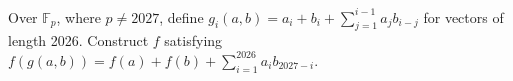 Over $\mathbb F_p$, where $p\ne2027$, define $g_i(a,b)=a_i+b_i+\sum_{j=1}^{i-1}a_jb_{i-j}$ for vectors of length 2026. Construct $f$ satisfying $f(g(a,b))=f(a)+f(b)+\sum_{i=1}^{2026}a_ib_{2027-i}$.
